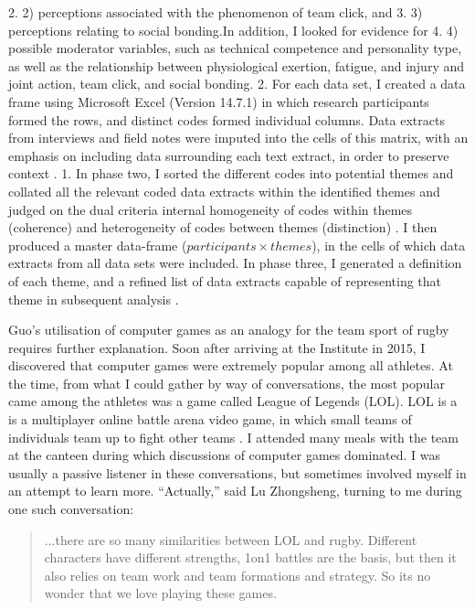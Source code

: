 \begin{CJK}{UTF8}{gbsn}
  2. 2) perceptions associated with the phenomenon of team click, and
  3. 3) perceptions relating to social bonding.In addition, I looked for evidence for
  4. 4) possible moderator variables, such as technical competence and personality type, as well as the relationship between physiological exertion, fatigue, and injury and joint action, team click, and social bonding.
2. For each data set, I created a data frame using Microsoft Excel (Version 14.7.1) in which research participants formed the rows, and distinct codes formed individual columns. Data extracts from interviews and field notes were imputed into the cells of this matrix, with an emphasis on including data surrounding each text extract, in order to preserve context \citep[see][]{Bryman2001}.
1. In phase two, I sorted the different codes into potential themes and collated all the relevant coded data extracts within the identified themes and judged on the dual criteria internal homogeneity of codes within themes (coherence) and heterogeneity of codes between themes (distinction) \citep{Patton1990}.  I then produced a master data-frame ($ participants \times themes$), in the cells of which data extracts from all data sets were included.  In phase three, I generated a definition of each theme, and a refined list of data extracts capable of representing that theme in subsequent analysis \citep{Braun2006}.











Guo's utilisation of computer games as an analogy for the team sport of rugby requires further explanation. Soon after arriving at the Institute in 2015, I discovered that computer games were extremely popular among all athletes.  At the time, from what I could gather by way of conversations, the most popular came among the athletes was a game called League of Legends (LOL). LOL is a is a multiplayer online battle arena video game, in which small teams of individuals team up to fight other teams \citep{Wikipedia2018}.  I attended many meals with the team at the canteen during which discussions of computer games dominated. I was usually a passive listener in these conversations, but sometimes involved myself in an attempt to learn more.  ``Actually,'' said Lu Zhongsheng, turning to me during one such conversation:

  \begin{quote}
    ...there are so many similarities between LOL and rugby.  Different characters have different strengths, 1on1 battles are the basis, but then it also relies on team work and team formations and strategy.  So its no wonder that we love playing these games.
  \end{quote}


\end{CJK}
